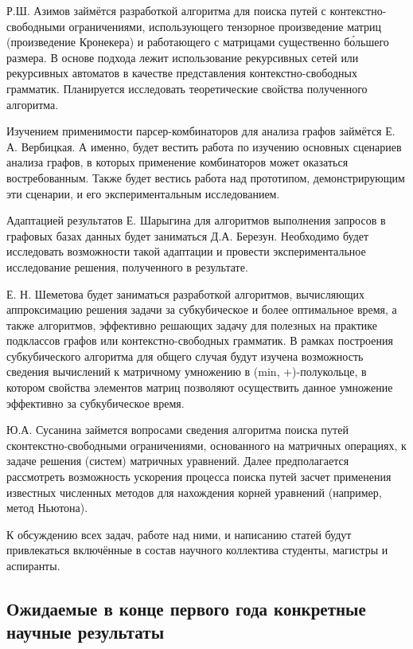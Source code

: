 \documentclass[12pt]{article}  %
\theoremstyle{remark}
\begin{document}
Р.Ш. Азимов займётся разработкой алгоритма для поиска путей с контекстно-свободными ограничениями, использующего тензорное произведение матриц (произведение Кронекера) и работающего с матрицами существенно б\'{о}льшего размера. В основе подхода лежит использование рекурсивных сетей или рекурсивных автоматов в качестве представления контекстно-свободных грамматик. Планируется исследовать теоретические свойства полученного алгоритма.

Изучением применимости парсер-комбинаторов для анализа графов займётся Е. А. Вербицкая. А именно, будет вестить работа по изучению основных сценариев анализа графов, в которых применение комбинаторов может оказаться востребованным. Также будет вестись работа над прототипом, демонстрирующим эти сценарии, и его экспериментальным исследованием.

Адаптацией результатов Е. Шарыгина для алгоритмов выполнения запросов в графовых базах данных будет заниматься Д.А. Березун. Необходимо будет исследовать возможности такой адаптации и провести экспериментальное исследование решения, полученного в результате.

Е. Н. Шеметова будет заниматься разработкой алгоритмов, вычисляющих аппроксимацию решения задачи за субкубическое и более оптимальное время, а также алгоритмов, эффективно решающих задачу для полезных на практике подклассов графов или контекстно-свободных грамматик. В рамках построения субкубического алгоритма для общего случая будут изучена возможность сведения вычислений к матричному умножению в (min, +)-полукольце, в котором свойства элементов матриц позволяют осуществить данное умножение эффективно за субкубическое время.

Ю.А. Сусанина займется вопросами сведения алгоритма поиска путей сконтекстно-свободными ограничениями, основанного на матричных операциях, к задаче решения (систем) матричных уравнений. Далее предполагается рассмотреть возможность ускорения процесса поиска путей засчет применения известных численных методов для нахождения корней уравнений (например, метод Ньютона).

К обсуждению всех задач, работе над ними, и написанию статей будут привлекаться включённые в состав научного коллектива студенты, магистры и аспиранты.

\subsection{Ожидаемые в конце первого года конкретные научные результаты}
\end{document}
